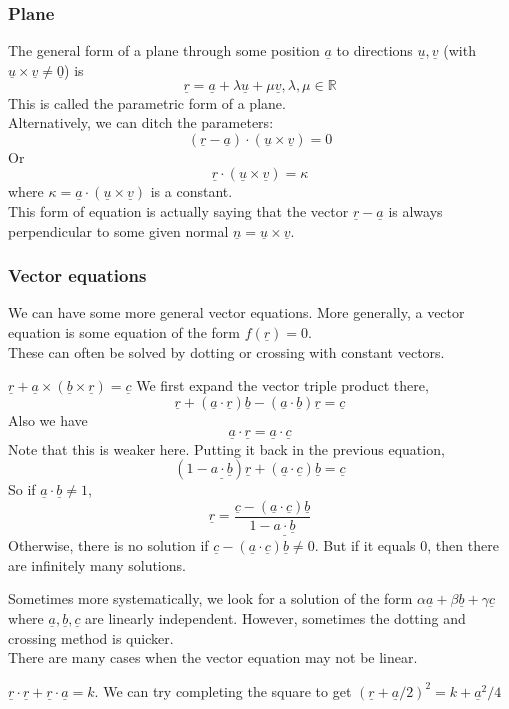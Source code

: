 \subsubsection{Plane}
The general form of a plane through some position $\underline{a}$ to directions $\underline{u},\underline{v}$ (with $\underline{u}\times\underline{v}\neq\underline{0}$) is
$$\underline{r}=\underline{a}+\lambda\underline{u}+\mu\underline{v}, \lambda,\mu\in\mathbb R$$
This is called the parametric form of a plane.\\
Alternatively, we can ditch the parameters:
$$(\underline{r}-\underline{a})\cdot(\underline{u}\times\underline{v})=0$$
Or
$$\underline{r}\cdot(\underline{u}\times\underline{v})=\kappa$$
where $\kappa=\underline{a}\cdot(\underline{u}\times\underline{v})$ is a constant.\\
This form of equation is actually saying that the vector $\underline{r}-\underline{a}$ is always perpendicular to some given normal $\underline{n}=\underline{u}\times\underline{v}$.
\subsubsection{Vector equations}
We can have some more general vector equations.
More generally, a vector equation is some equation of the form $f(\underline{r})=0$.\\
These can often be solved by dotting or crossing with constant vectors.
\begin{example}
    $\underline{r}+\underline{a}\times(\underline{b}\times\underline{r})=\underline{c}$
    We first expand the vector triple product there,
    $$\underline{r}+(\underline{a}\cdot\underline{r})\underline{b}-(\underline{a}\cdot\underline{b})\underline{r}=\underline{c}$$
    Also we have
    $$\underline{a}\cdot\underline{r}=\underline{a}\cdot\underline{c}$$
    Note that this is weaker here.
    Putting it back in the previous equation,
    $$(1-\underline{a\cdot\underline{b}})\underline{r}+(\underline{a}\cdot\underline{c})\underline{b}=\underline{c}$$
    So if $\underline{a}\cdot\underline{b}\neq 1$,
    $$\underline{r}=\frac{\underline{c}-(\underline{a}\cdot\underline{c})\underline{b}}{1-\underline{a\cdot\underline{b}}}$$
    Otherwise, there is no solution if $\underline{c}-(\underline{a}\cdot\underline{c})\underline{b}\neq 0$.
    But if it equals $0$, then there are infinitely many solutions.
\end{example}
Sometimes more systematically, we look for a solution of the form $\alpha\underline{a}+\beta\underline{b}+\gamma\underline{c}$ where $\underline{a},\underline{b},\underline{c}$ are linearly independent.
However, sometimes the dotting and crossing method is quicker.\\
There are many cases when the vector equation may not be linear.
\begin{example}
    $\underline{r}\cdot\underline{r}+\underline{r}\cdot\underline{a}=k$.
    We can try completing the square to get
    $(\underline{r}+\underline{a}/2)^2=k+\underline{a}^2/4$
\end{example}
